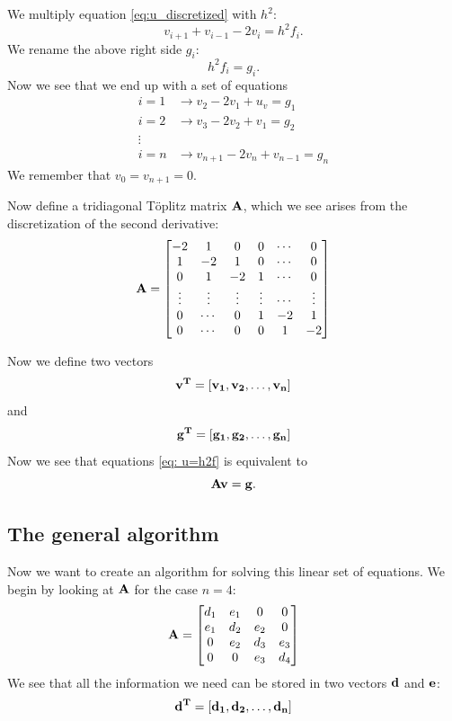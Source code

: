 \documentclass[english, nofootinbib]{revtex4-1}  %
\begin{document}
We multiply equation \ref{eq:u_discretized} with $h^2$:
\begin{equation} \label{eq: u=h2f}
v_{i+1} + v_{i-1} - 2v_i = h^2 f_i.
\end{equation} 
We rename the above right side $g_i$:
\begin{equation} \label{eq: h2f=g}
h^2 f_i = g_i.
\end{equation}
Now we see that we end up with a set of equations
\begin{equation}
\begin{aligned}
i = 1 &\rightarrow v_2 -2v_1 + u_v = g_1\\
i = 2 &\rightarrow v_3 -2v_2 + v_1 = g_2\\
\vdots \\
i = n &\rightarrow v_{n+1} -2v_{n} + v_{n-1} = g_{n}
\end{aligned}
\end{equation}
We remember that $v_0 = v_{n+1} = 0$.

Now define a tridiagonal Töplitz matrix $\bf{A}$, which we see arises from the discretization of the second derivative:
$$
\bf{A} = \begin{bmatrix}
-2 & 1 & 0 & 0 & \cdots & 0\\
1 & -2 & 1 & 0 & \cdots & 0\\
0 & 1 & -2 & 1 & \cdots & 0\\
\vdots &\vdots & \vdots & \vdots & \cdots & \vdots \\
0 & \cdots & 0 & 1 & -2 & 1\\
0 & \cdots & 0 & 0 & 1 & -2
\end{bmatrix}
$$

Now we define two vectors
\begin{equation}
\bf{v}^T = [v_1, v_2, \dots , v_{n}]
\end{equation}
and
\begin{equation}
\bf{g}^T = [g_1, g_2, \dots , g_{n}]
\end{equation}
Now we see that equations \ref{eq: u=h2f} is equivalent to 
\begin{equation}
\bf{A}\bf{v} = \bf{g}.
\end{equation}

\subsection{The general algorithm}
Now we want to create an algorithm for solving this linear set of equations. We begin by looking at $\bf{A}$ for the case $n = 4$:
$$
\bf{A} = \begin{bmatrix}
d_1 & e_1 & 0 & 0\\
e_1 & d_2 & e_2 & 0\\
0 & e_2 & d_3 & e_3\\
0 & 0 & e_3 & d_4
\end{bmatrix}
$$
We see that all the information we need can be stored in two vectors $\bf{d}$ and $\bf{e}$:
\begin{equation}
\bf{d}^T = [d_1, d_2, \dots, d_{n}]
\end{equation}
\end{document}
